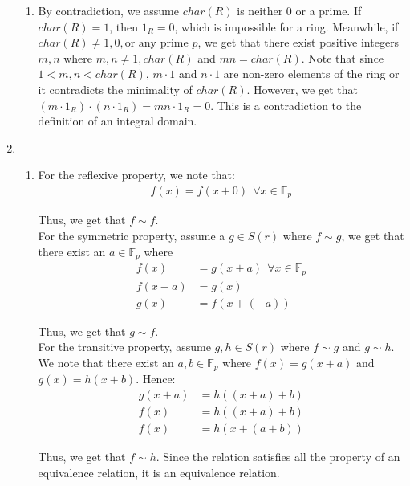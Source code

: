 \documentclass{article}
\begin{document}
\begin{enumerate}
\begin{enumerate}
    \item 
    By contradiction, we assume $char(R)$ is neither $0$ or a prime. If $char(R) = 1$, then $ 1_R = 0$, which is impossible for a ring. Meanwhile, if $char(R) \not = 1, 0, \text{or any prime } p$, we get that there exist positive integers $m, n$ where $m, n \not = 1, char(R)$ and $mn = char(R)$. Note that since $1 < m, n < char(R)$, $m \cdot 1$ and $n \cdot 1$ are non-zero elements of the ring or it contradicts the minimality of $char(R)$. However, we get that $(m \cdot 1_R) \cdot (n \cdot 1_R) = mn \cdot 1_R = 0$. This is a contradiction to the definition of an integral domain.

\end{enumerate}

\newpage

\item 
\begin{enumerate}
    \item 
    For the reflexive property, we note that: 
    \begin{align*}
        f(x) = f(x + 0) \ \ \forall x \in \mathbb{F}_p         
    \end{align*}

    Thus, we get that $f \sim f$. \\

    For the symmetric property, assume a $g \in S(r)$ where $f \sim g$, we get that there exist an $a \in \mathbb{F}_p$ where
    \begin{align*}
        f(x) &= g(x + a) \ \ \forall x \in \mathbb{F}_p \\
        f(x-a) &= g(x) \\
        g(x) &= f(x + (-a)) 
    \end{align*}

    Thus, we get that $g \sim f$. \\

    For the transitive property, assume $g, h \in S(r)$ where $f \sim g$ and $g \sim h$. We note that there exist an $a, b \in  \mathbb{F}_p $ where $f(x) = g(x+ a)$ and $g(x) = h(x + b)$. Hence: 
    \begin{align*}
        g(x+ a) &= h((x + a) + b) \\
        f(x) &= h((x+a) + b)\\
        f(x) &= h(x + (a  + b))
    \end{align*}

    Thus, we get that $f \sim h$. Since the relation satisfies all the property of an equivalence relation, it is an equivalence relation. \\


\end{enumerate}
\end{enumerate}
\end{document}
